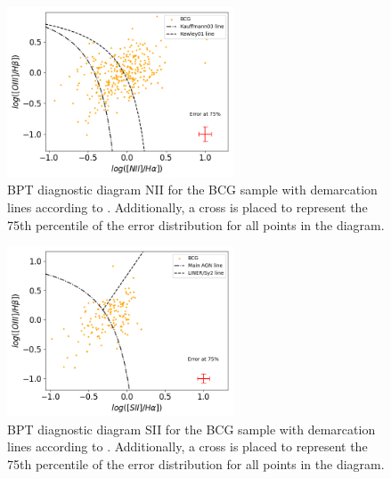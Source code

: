 \vspace{2cm}
\begin{figure}[hbtp]
  \centering
  \includegraphics[width=0.6\textwidth]{BCG-NII-V22}
  \caption{BPT diagnostic diagram NII for the BCG sample with demarcation lines according to \cite{2006MNRAS.372..961K}.
  Additionally, a cross is placed to represent the 75th percentile of the error distribution for all points in the diagram.  }
  \label{4}
\end{figure}

\begin{figure}[hbtp]
  \centering
  \includegraphics[width=0.6\textwidth]{BCG-SII1731-V22}
  \caption{BPT diagnostic diagram SII for the BCG sample with demarcation lines according to \cite{2006MNRAS.372..961K}.
  Additionally, a cross is placed to represent the 75th percentile of the error distribution for all points in the diagram. }
  \label{5}
\end{figure}


